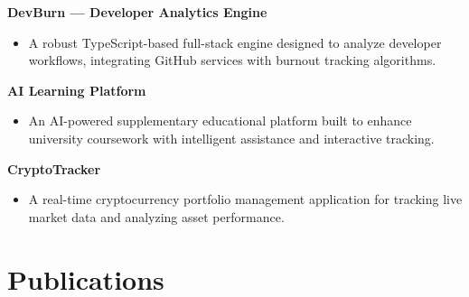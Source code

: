 \documentclass[a4paper,11pt]{article}
\begin{document}
\textbf{DevBurn — Developer Analytics Engine} \\
\begin{itemize}
\vspace{-1.5em}
    \item A robust TypeScript-based full-stack engine designed to analyze developer workflows, integrating GitHub services with burnout tracking algorithms.
\end{itemize}

\textbf{AI Learning Platform} \\
\begin{itemize}
\vspace{-1.5em}
    \item An AI-powered supplementary educational platform built to enhance university coursework with intelligent assistance and interactive tracking.
\end{itemize}

\textbf{CryptoTracker} \\
\begin{itemize}
\vspace{-1.5em}
    \item A real-time cryptocurrency portfolio management application for tracking live market data and analyzing asset performance.
\end{itemize}

\section{Publications}
\end{document}
